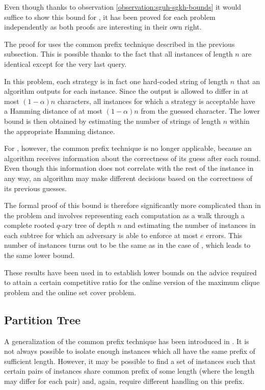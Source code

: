 
Even though thanks to observation \ref{observation:sguh-sgkh-bounds} it
would suffice to show this bound for , it has been proved for each
problem independently as both proofs are interesting in their own right.

The proof for  uses the common prefix technique described in the
previous subsection. This is possible thanks to the fact that all
instances of length $n$ are identical except for the very last query.

In this problem, each strategy is in fact one hard-coded string of length
$n$ that an algorithm outputs for each instance. Since the output is
allowed to differ in at most $(1-\alpha)n$ characters, all instances for
which a strategy is acceptable have a Hamming distance of at most
$(1-\alpha)n$ from the guessed character. The lower bound is then obtained
by estimating the number of strings of length $n$ within the appropriate
Hamming distance.

For , however, the common prefix technique is no longer
applicable, because an algorithm receives information about the
correctness of its guess after each round. Even though this information
does not correlate with the rest of the instance in any way, an algorithm
may make different decisions based on the correctness of its previous
guesses.

The formal proof of this bound is therefore significantly more complicated
than in the  problem and involves representing each computation as
a walk through a complete rooted $q$-ary tree of depth $n$ and estimating
the number of instances in each subtree for which an adversary is able to
enforce at most $e$ errors. This number of instances turns out to be the
same as in the case of , which leads to the same lower bound.

These results have been used in \cite{string-guessing} to establish lower
bounds on the advice required to attain a certain competitive ratio for
the online version of the maximum clique problem and the online set cover
problem.

\subsection{Partition Tree}

A generalization of the common prefix technique has been introduced in
\cite{sofsem2014}. It is not always possible to isolate enough instances
which all have the same prefix of sufficient length. However, it may be
possible to find a set of instances such that certain pairs of instances
share common prefix of some length (where the length may differ for each
pair) and, again, require different handling on this prefix.

